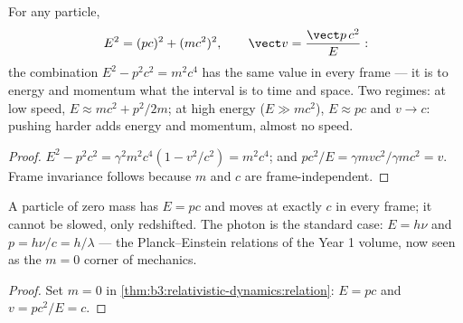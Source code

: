 \begin{theorem}\label{thm:b3:relativistic-dynamics:relation}
For any particle,
\[
E^2 = (pc)^2 + (mc^2)^2 ,
\qquad
\vect v = \frac{\vect p\,c^2}{E} :
\]
the combination $E^2 - p^2c^2 = m^2c^4$ has the same value in every
frame --- it is to energy and momentum what the interval is to time
and space. Two regimes: at low speed, $E \approx mc^2 + p^2/2m$; at
high energy ($E \gg mc^2$), $E \approx pc$ and $v \to c$: pushing
harder adds energy and momentum, almost no speed.
\end{theorem}

\begin{proof}
$E^2 - p^2c^2 = \gamma^2m^2c^4(1 - v^2/c^2) = m^2c^4$; and $pc^2/E =
\gamma mvc^2/\gamma mc^2 = v$. Frame invariance follows because $m$
and $c$ are frame-independent.
\end{proof}

\begin{proposition}\label{prop:b3:relativistic-dynamics:massless}
A particle of zero mass has $E = pc$ and moves at exactly $c$ in every
frame; it cannot be slowed, only redshifted. The photon is the
standard case: $E = h\nu$ and $p = h\nu/c = h/\lambda$ --- the
Planck--Einstein relations of the Year 1 volume, now seen as the
$m = 0$ corner of mechanics.
\end{proposition}

\begin{proof}
Set $m = 0$ in \cref{thm:b3:relativistic-dynamics:relation}: $E = pc$
and $v = pc^2/E = c$.
\end{proof}

